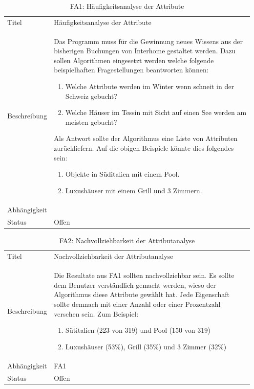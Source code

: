 \begin{table}[H] 
	\caption{FA1: Häufigkeitsanalyse der Attribute}
	\centering
	\label{fig:anforderungsanalyse:funktionaleanforderung:fa1}
	\begin{tabular}{ | l | L{10cm} | } 
		\hline 
		 \\ \hline 
		Titel & Häufigkeitsanalyse der Attribute \\ \hline 
		Beschreibung & Das Programm muss für die Gewinnung neues Wissens aus der bisherigen Buchungen von Interhome gestaltet werden. Dazu sollen Algorithmen eingesetzt werden welche folgende beispielhaften Fragestellungen beantworten können:
		\begin{enumerate}
		\item Welche Attribute werden im Winter wenn schneit in der Schweiz gebucht?
		\item Welche Häuser im Tessin mit Sicht auf einen See werden am meisten gebucht?
		\end{enumerate}
		
		Als Antwort sollte der Algorithmus eine Liste von Attributen zurückliefern. Auf die obigen Beispiele könnte dies folgendes sein:
		\begin{enumerate}
		\item Objekte in Süditalien mit einem Pool.
		\item Luxushäuser mit einem Grill und 3 Zimmern.
		\end{enumerate} \\ \hline 
		Abhängigkeit & \\ \hline 
		Status & Offen \\ \hline 
	\end{tabular}
\end{table}

\begin{table}[H] 
	\caption{FA2: Nachvollziehbarkeit der Attributanalyse}
	\centering
	\label{fig:anforderungsanalyse:funktionaleanforderung:fa2}
	\begin{tabular}{ | l | L{10cm} | } 
		\hline 
		 \\ \hline 
		Titel & Nachvollziehbarkeit der Attributanalyse \\ \hline 
		Beschreibung & Die Resultate aus FA1 sollten nachvollziehbar sein. Es sollte dem Benutzer verständlich gemacht werden, wieso der Algorithmus diese Attribute gewählt hat. Jede Eigenschaft sollte demnach mit einer Anzahl oder einer Prozentzahl versehen sein. Zum Beispiel:
			\begin{enumerate}
			\item Sütitalien (223 von 319) und Pool (150 von 319)
			\item Luxushäuser (53\%), Grill (35\%) und 3 Zimmer (32\%)
			\end{enumerate} \\ \hline 
		Abhängigkeit & FA1 \\ \hline 
		Status & Offen \\ \hline 
	\end{tabular}
\end{table}

